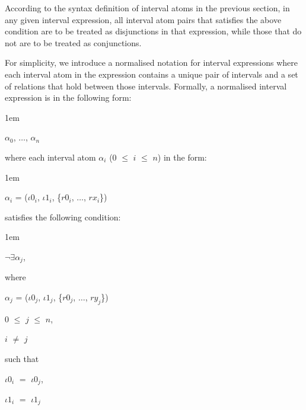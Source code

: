 \documentclass[11pt]{report}
\newenvironment{vquote}
{
  \begin{list}{}{\leftmargin 1em}\item[]
}
{
  \end{list}
}
\begin{document}
            According to the syntax definition of interval atoms in the
            previous section, in any given interval expression, all interval
            atom pairs that satisfies the above condition are to be treated
            as disjunctions in that expression, while those that do not are
            to be treated as conjunctions.

            For simplicity, we introduce a normalised notation for interval
            expressions where each interval atom in the expression contains a
            unique pair of intervals and a set of relations that hold between
            those intervals. Formally, a normalised interval expression is
            in the following form:

            \begin{vquote}
              ${\alpha}_0$, $\ldots$, ${\alpha}_n$
            \end{vquote}

            \noindent
            where each interval atom ${\alpha}_i$ ($0$ $\leq$ $i$ $\leq$ $n$)
            in the form:

            \begin{vquote}
              ${\alpha}_i$ =
                (${\iota}0_i$, ${\iota}1_i$, \{$r0_i$, $\ldots$, $rx_i$\})
            \end{vquote}

            \noindent
            satisfies the following condition:

            \begin{vquote}
              $\lnot$$\exists$${\alpha}_j$,

              where

              \hspace{1em}
              ${\alpha}_j$ =
                (${\iota}0_j$, ${\iota}1_j$, \{$r0_j$, $\ldots$, $ry_j$\})

              \hspace{1em}
              $0$ $\leq$ $j$ $\leq$ $n$,

              \hspace{1em}
              $i$ $\neq$ $j$

              such that

              \hspace{1em}
              ${\iota}0_i$ $=$ ${\iota}0_j$,

              \hspace{1em}
              ${\iota}1_i$ $=$ ${\iota}1_j$
            \end{vquote}
\end{document}

